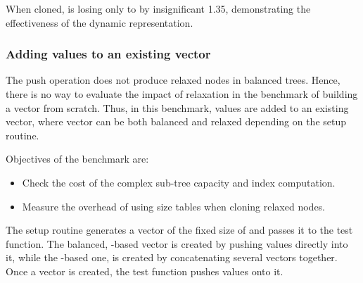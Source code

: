 When cloned, \pvec{} is losing only to \rbvec{} by insignificant 1.35, demonstrating the effectiveness of the dynamic representation.

\subsubsection*{Adding values to an existing vector}
The push operation does not produce relaxed nodes in balanced trees. Hence, there is no way to evaluate the impact of relaxation in the benchmark of building a vector from scratch. Thus, in this benchmark, values are added to an existing vector, where vector can be both balanced and relaxed depending on the setup routine.

Objectives of the benchmark are:
\begin{itemize}
    \item Check the cost of the complex sub-tree capacity and index computation.
    \item Measure the overhead of using size tables when cloning relaxed nodes.
\end{itemize}

The setup routine generates a vector of the fixed size of \n{} and passes it to the test function. The balanced, \rbtree{}-based vector is created by pushing values directly into it, while the \rrbtree{}-based one, is created by concatenating several vectors together. Once a vector is created, the test function pushes \n{} values onto it.

